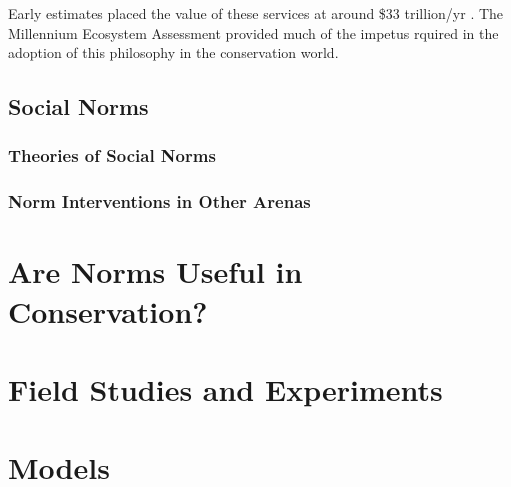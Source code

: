 \documentclass[rutwik_proposal.tex]{subfiles}
\begin{document}
Early estimates placed the value of these services at around \$33 trillion/yr \cite{dArge97}. The Millennium Ecosystem Assessment provided much of the impetus rquired in the adoption of this philosophy in the conservation world.

\section{Social Norms}\label{sec:norms}
\subsection{Theories of Social Norms}\label{subsec:theories}
\subsection{Norm Interventions in Other Arenas}\label{subsec:interventions}

\chapter{Are Norms Useful in Conservation?}\label{ch:usefulness}

\chapter{Field Studies and Experiments}\label{ch:field}

\chapter{Models}\label{ch:models}
\end{document}
